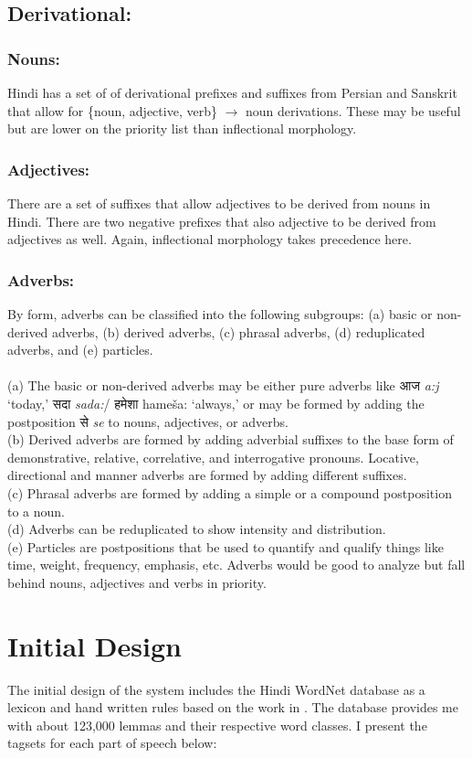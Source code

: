 \documentclass[11pt,letterpaper]{article}
\begin{document}
\subsection{Derivational:}
\subsubsection{Nouns:}
Hindi has a set of of derivational prefixes and suffixes from Persian and Sanskrit that allow for \{noun, adjective, verb\} $\rightarrow$ noun derivations. These may be useful but are lower on the priority list than inflectional morphology.
\subsubsection{Adjectives:}
There are a set of suffixes that allow adjectives to be derived from nouns in Hindi. There are two negative prefixes that also adjective to be derived from adjectives as well. Again, inflectional morphology takes precedence here.
\subsubsection{Adverbs:}
By form, adverbs can be classified into the following subgroups: (a)
basic or non-derived adverbs, (b) derived adverbs, (c) phrasal
adverbs, (d) reduplicated adverbs, and (e) particles.\\
\\
(a) The basic or non-derived adverbs may be either pure adverbs like
आज \textit{a:j} ‘today,’ सदा \textit{sada:}/ हमेशा hameša: ‘always,’ or may be formed
by adding the postposition से \textit{se} to nouns, adjectives, or adverbs.\\
(b) Derived adverbs are formed by adding adverbial suffixes to the
base form of demonstrative, relative, correlative, and interrogative
pronouns. Locative, directional and manner adverbs are formed by adding different suffixes.\\
(c) Phrasal adverbs are formed by adding a simple or a compound
postposition to a noun.\\
(d) Adverbs can be reduplicated to show intensity and distribution.\\
(e) Particles are postpositions that be used to quantify and qualify things like time, weight, frequency, emphasis, etc.
Adverbs would be good to analyze but fall behind nouns, adjectives and verbs in priority.
\section{Initial Design}
The initial design of the system includes the Hindi WordNet database as a lexicon and hand written rules based on the work in \cite{koul}. The database provides me with about 123,000 lemmas and their respective word classes. I present the tagsets for each part of speech below:\\
\end{document}
